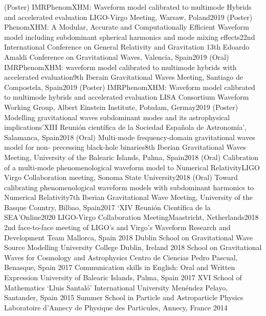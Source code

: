\begin{cvpress} 
   \cvpres
    {(Poster) IMRPhenomXHM: Waveform model calibrated to multimode
Hybrids and accelerated evaluation}{
LIGO-Virgo Meeting, Warsaw, Poland}{2019}
    \cvpres
    {(Poster) PhenomXHM: A Modular, Accurate and Computationally
Efficient Waveform model including subdominant spherical harmonics and mode
mixing effects}{22nd International Conference on General Relativity and Gravitation 13th Edoardo Amaldi Conference on Gravitational Waves, Valencia, Spain}{2019}
    \cvpres
    {(Oral) IMRPhenomXHM: waveform model calibrated to multimode
hybrids with accelerated evaluation}{9th Iberain Gravitational Waves Meeting, Santiago de Compostela, Spain}{2019}
    \cvpres
    {(Poster) IMRPhenomXHM: Waveform model calibrated to multimode
hybrids and accelerated evaluation}{
LISA Consortium Waveform Working Group, Albert Einstein Institute, Potsdam,
Germay}{2019}
    \cvpres
    {(Poster) Modelling gravitational waves subdominant modes and its
astrophysical implications}{’XIII Reunión científica de la Sociedad Española de Astronomía’, Salamanca, Spain}{2018}
    \cvpres
    {(Oral) Multi-mode frequency-domain gravitational waves model for non-
precessing black-hole binaries}{8th Iberian Gravitational Waves Meeting, University of the Balearic Islands, Palma, Spain}{2018}
    \cvpres
    {(Oral) Calibration of a multi-mode phenomenological waveform model to
Numerical Relativity}{LIGO Virgo Collaboration meeting, Sonoma State University}{2018}
    \cvpres
    {(Oral) Toward calibrating phenomenological waveform models with
subdominant harmonics to Numerical Relativity}{7th Iberian Gravitational Wave
Meeting, University of the Basque Country, Bilbao, Spain}{2017}
    \cvpres
    {`XIV Reunión Científica de la SEA'}{Online}{2020}
  \cvpres
   {LIGO-Virgo Collaboration Meeting}{Maastricht, Netherlands}{2018}
  \cvpres 
  {2nd face-to-face meeting of LIGO’s and Virgo’s Waveform Research and Development Team}
  {Mallorca, Spain}
  {2018} 
  \cvpres
  {Dublin School on Gravitational Wave Source Modelling}
  {University College Dublin, Ireland}
  {2018}
   \cvpres
   {School on Gravitational Waves for Cosmology and Astrophysics}
   {Centro de Ciencias Pedro Pascual, Benasque, Spain}
   {2017}
   \cvpres
   {Communication skills in English: Oral and Written Expression}
   {University of Balearic Islands, Palma, Spain}
    {2017}
   \cvpres
  {XVI School of Mathematics `Lluis Santaló'}
  {International University Menéndez Pelayo, Santander, Spain}
  {2015}
   \cvpres
   {Summer School in Particle and Astroparticle Physics}
   {Laboratoire d’Annecy de Physique des Particules, Annecy, France}
   {2014}
\end{cvpress}


